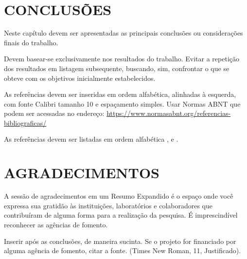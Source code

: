 \documentclass[a4paper,11pt]{article} %
\begin{document}
\section{CONCLUSÕES}

Neste capítulo devem ser apresentadas as principais conclusões ou considerações finais do trabalho.

Devem basear-se exclusivamente nos resultados do trabalho. Evitar a repetição dos resultados em listagem subsequente, buscando, sim, confrontar o que se obteve com os objetivos inicialmente estabelecidos.




As referências devem ser inseridas em ordem alfabética, alinhadas à esquerda, com fonte Calibri tamanho 10 e espaçamento simples. Usar Normas ABNT que podem ser acessadas no endereço: \url{https://www.normasabnt.org/referencias-bibliograficas/}

As referências devem ser listadas em ordem alfabética \cite{galvani}, \cite{national_instruments} e \cite{pandorfi}.







\section*{AGRADECIMENTOS}

A sessão de agradecimentos em um Resumo Expandido é o espaço onde você expressa sua gratidão às instituições, laboratórios e colaboradores que contribuíram de alguma forma para a realização da pesquisa. É imprescindível reconhecer as agências de fomento.

Inserir após as conclusões, de maneira sucinta. Se o projeto for financiado por alguma agência de fomento, citar a fonte. (Times New Roman, 11, Justificado).
\end{document}
